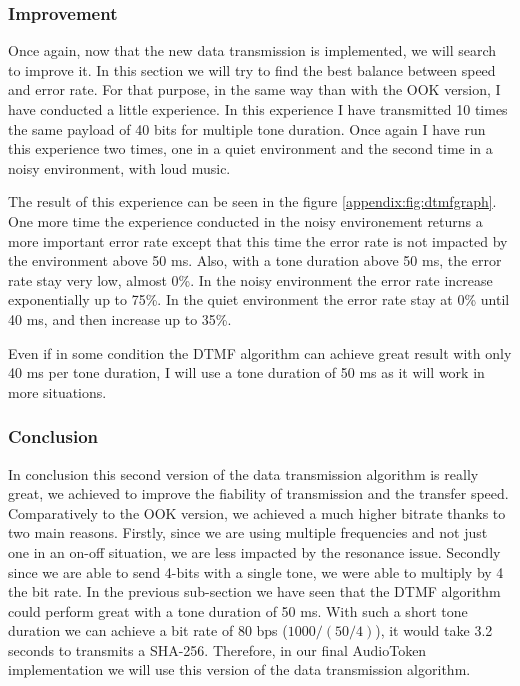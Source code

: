 \documentclass[twocolumn,14pt]{extarticle}
\begin{document}
\subsubsection{Improvement}
Once again, now that the new data transmission is implemented, we will search to improve it. In this section we will try to find the best balance between speed and error rate. For that purpose, in the same way than with the OOK version, I have conducted a little experience. In this experience I have transmitted 10 times the same payload of 40 bits for multiple tone duration. Once again I have run this experience two times, one in a quiet environment and the second time in a noisy environment, with loud music.

The result of this experience can be seen in the figure \ref{appendix:fig:dtmfgraph}. One more time the experience conducted in the noisy environement returns a more important error rate except that this time the error rate is not impacted by the environment above 50 ms. Also, with a tone duration above 50 ms, the error rate stay very low, almost 0\%. In the noisy environment the error rate increase exponentially up to 75\%. In the quiet environment the error rate stay at 0\% until 40 ms, and then increase up to 35\%.

Even if in some condition the DTMF algorithm can achieve great result with only 40 ms per tone duration, I will use a tone duration of 50 ms as it will work in more situations.


\subsubsection{Conclusion}
In conclusion this second version of the data transmission algorithm is really great, we achieved to improve the fiability of transmission and the transfer speed. Comparatively to the OOK version, we achieved a much higher bitrate thanks to two main reasons. Firstly, since we are using multiple frequencies and not just one in an on-off situation, we are less impacted by the resonance issue. Secondly since we are able to send 4-bits with a single tone, we were able to multiply by 4 the bit rate. In the previous sub-section we have seen that the DTMF algorithm could perform great with a tone duration of 50 ms. With such a short tone duration we can achieve a bit rate of 80 bps ($1000/(50/4)$), it would take 3.2 seconds to transmits a SHA-256. Therefore, in our final AudioToken implementation we will use this version of the data transmission algorithm.
\end{document}
